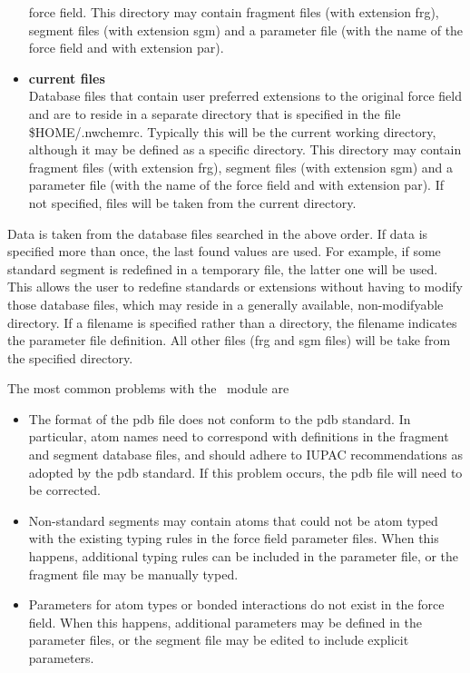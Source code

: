 \begin{itemize}
force field. This directory may contain fragment files (with extension frg),
segment files (with extension sgm) and a parameter file (with the name
of the force field and with extension par).
\item[{\bf *}]
{\bf current files}\\
Database files that contain user preferred extensions to the original
force field and are to reside in a separate directory that is specified in 
the file \$HOME/.nwchemrc. Typically this will be the current working
directory, although it may be defined as a specific directory.
This directory may contain fragment files (with extension frg),
segment files (with extension sgm) and a parameter file (with the name
of the force field and with extension par). If not specified, 
files will be taken from the current directory.
\end{itemize}

Data is taken from the database files searched in the above order. If data
is specified more than once, the last found values are used. For example,
if some standard segment is redefined in a temporary file, the latter one
will be used. This allows the user to redefine standards or extensions 
without having to modify those database files, which may reside in a
generally available, non-modifyable directory. If a filename is specified
rather than a directory, the filename indicates the parameter file
definition. All other files (frg and sgm files) will be take from the
specified directory.
\par
The most common problems with the \prepare\ module are
\begin{itemize}
\item[{\bf ~}]
The format of the pdb file does not conform to the pdb standard. In
particular, atom names need to correspond with definitions in the
fragment and segment database files, and should adhere to IUPAC
recommendations as adopted by the pdb standard. If this problem
occurs, the pdb file will need to be corrected.
\item[{\bf ~}]
Non-standard segments may contain atoms that could not be atom typed
with the existing typing rules in the force field parameter files.
When this happens, additional typing rules can be included in the
parameter file, or the fragment file may be manually typed.
\item[{\bf ~}]
Parameters for atom types or bonded interactions do not exist in
the force field. When this happens, additional parameters may be
defined in the parameter files, or the segment file may be edited
to include explicit parameters.
\end{itemize}

